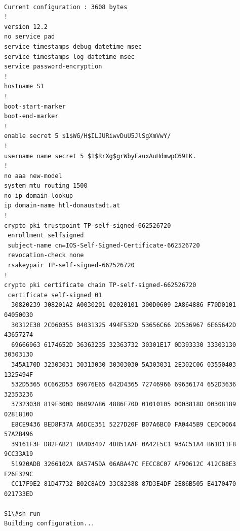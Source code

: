 \documentclass[a4paper]{article}
\begin{document}
\begin{lstlisting}
	
Current configuration : 3608 bytes
!
version 12.2
no service pad
service timestamps debug datetime msec
service timestamps log datetime msec
service password-encryption
!
hostname S1
!
boot-start-marker
boot-end-marker
!
enable secret 5 $1$WG/H$ILJURiwvDuU5JlSgXmVwY/
!
username name secret 5 $1$RrXg$grWbyFauxAuHdmwpC69tK.
!
no aaa new-model
system mtu routing 1500
no ip domain-lookup
ip domain-name htl-donaustadt.at
!
crypto pki trustpoint TP-self-signed-662526720
 enrollment selfsigned
 subject-name cn=IOS-Self-Signed-Certificate-662526720
 revocation-check none
 rsakeypair TP-self-signed-662526720
!
crypto pki certificate chain TP-self-signed-662526720
 certificate self-signed 01
  30820239 308201A2 A0030201 02020101 300D0609 2A864886 F70D0101 04050030
  30312E30 2C060355 04031325 494F532D 53656C66 2D536967 6E65642D 43657274
  69666963 6174652D 36363235 32363732 30301E17 0D393330 33303130 30303130
  345A170D 32303031 30313030 30303030 5A303031 2E302C06 03550403 1325494F
  532D5365 6C662D53 69676E65 642D4365 72746966 69636174 652D3636 32353236
  37323030 819F300D 06092A86 4886F70D 01010105 0003818D 00308189 02818100
  E8CE9436 BED8F37A A6DCE351 5227D20F B07A6BC0 FA0445B9 CEDC0064 57A2B496
  39161F3F D82FAB21 BA4D34D7 4DB51AAF 0A42E5C1 93AC51A4 B61D11F8 9CC33A19
  51920ADB 3266102A 8A5745DA 06ABA47C FECC8C07 AF90612C 412CB8E3 F26E329C
  CC17F9E2 81D47732 B02C8AC9 33C82388 87D3E4DF 2E86B505 E4170470 021733ED

S1\#sh run
Building configuration...


\end{lstlisting}
\end{document}
